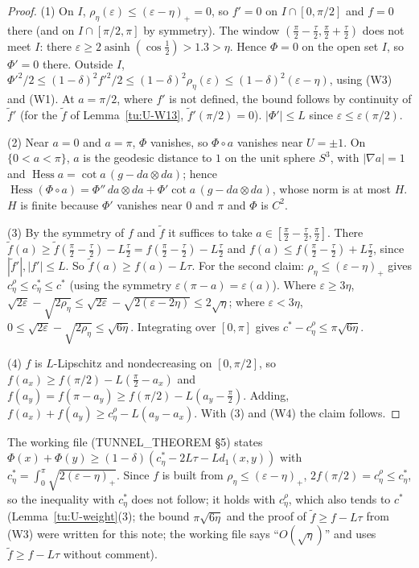 \begin{proof}
(1) On $I$, $\rho_\eta(\varepsilon)\le(\varepsilon-\eta)_+=0$, so $f'=0$ on $I\cap[0,\pi/2]$ and $f=0$ there (and on
$I\cap[\pi/2,\pi]$ by symmetry). The window $(\frac\pi2-\frac\tau2,\frac\pi2+\frac\tau2)$ does not meet $I$: there
$\varepsilon\ge2\operatorname{asinh}(\cos\frac12)>1.3>\eta$. Hence $\Phi=0$ on the open set $I$, so $\Phi'=0$ there. Outside $I$,
$\Phi'^2/2\le(1-\delta)^2f'^2/2\le(1-\delta)^2\rho_\eta(\varepsilon)\le(1-\delta)^2(\varepsilon-\eta)$, using (W3) and (W1).
At $a=\pi/2$, where $f'$ is not defined, the bound follows by continuity of $\tilde f'$ (for the $\tilde f$ of
Lemma~\ref{tu:U-W13}, $\tilde f'(\pi/2)=0$).
$|\Phi'|\le L$ since $\varepsilon\le\varepsilon(\pi/2)$.

(2) Near $a=0$ and $a=\pi$, $\Phi$ vanishes, so $\Phi\circ a$ vanishes near $U=\pm1$. On $\{0<a<\pi\}$, $a$ is the
geodesic distance to $1$ on the unit sphere $S^3$, with $|\nabla a|=1$ and
$\operatorname{Hess}a=\cot a\,(g-da\otimes da)$; hence
$\operatorname{Hess}(\Phi\circ a)=\Phi''\,da\otimes da+\Phi'\cot a\,(g-da\otimes da)$, whose norm is at most $H$. $H$ is finite
because $\Phi'$ vanishes near $0$ and $\pi$ and $\Phi$ is $C^2$.

(3) By the symmetry of $f$ and $\tilde f$ it suffices to take $a\in[\frac\pi2-\frac\tau2,\frac\pi2]$. There
$\tilde f(a)\ge\tilde f(\frac\pi2-\frac\tau2)-L\frac\tau2=f(\frac\pi2-\frac\tau2)-L\frac\tau2$ and
$f(a)\le f(\frac\pi2-\frac\tau2)+L\frac\tau2$, since $|\tilde f'|,|f'|\le L$. So $\tilde f(a)\ge f(a)-L\tau$. For the
second claim: $\rho_\eta\le(\varepsilon-\eta)_+$ gives $c^\rho_\eta\le c^*_\eta\le c^*$ (using the symmetry
$\varepsilon(\pi-a)=\varepsilon(a)$). Where $\varepsilon\ge3\eta$, $\sqrt{2\varepsilon}-\sqrt{2\rho_\eta}\le\sqrt{2\varepsilon}-\sqrt{2(\varepsilon-2\eta)}\le2\sqrt\eta$;
where $\varepsilon<3\eta$, $0\le\sqrt{2\varepsilon}-\sqrt{2\rho_\eta}\le\sqrt{6\eta}$. Integrating over $[0,\pi]$ gives
$c^*-c^\rho_\eta\le\pi\sqrt{6\eta}$.

(4) $f$ is $L$-Lipschitz and nondecreasing on $[0,\pi/2]$, so $f(a_x)\ge f(\pi/2)-L(\frac\pi2-a_x)$ and
$f(a_y)=f(\pi-a_y)\ge f(\pi/2)-L(a_y-\frac\pi2)$. Adding, $f(a_x)+f(a_y)\ge c^\rho_\eta-L(a_y-a_x)$. With (3) and (W4)
the claim follows.
\end{proof}

\begin{remark}\label{tu:U-weight-rem}
The working file (TUNNEL\_THEOREM \S5) states $\Phi(x)+\Phi(y)\ge(1-\delta)(c^*_\eta-2L\tau-Ld_1(x,y))$ with
$c^*_\eta=\int_0^\pi\sqrt{2(\varepsilon-\eta)_+}$. Since $f$ is built from $\rho_\eta\le(\varepsilon-\eta)_+$, $2f(\pi/2)=c^\rho_\eta\le c^*_\eta$,
so the inequality with $c^*_\eta$ does not follow; it holds with $c^\rho_\eta$, which also tends to $c^*$
(Lemma~\ref{tu:U-weight}(3); the bound $\pi\sqrt{6\eta}$ and the proof of $\tilde f\ge f-L\tau$ from (W3) were
written for this note; the working file says ``$O(\sqrt\eta)$'' and uses $\tilde f\ge f-L\tau$ without comment).
\end{remark}

